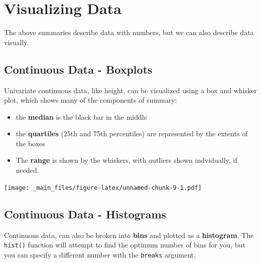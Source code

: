 \documentclass[
]{book}
\newenvironment{Shaded}{\begin{snugshade}}{\end{snugshade}}
\newcommand{\AttributeTok}[1]{\textcolor[rgb]{0.77,0.63,0.00}{#1}}
\newcommand{\FunctionTok}[1]{\textcolor[rgb]{0.00,0.00,0.00}{#1}}
\newcommand{\NormalTok}[1]{#1}
\newcommand{\SpecialCharTok}[1]{\textcolor[rgb]{0.00,0.00,0.00}{#1}}
\newcommand{\StringTok}[1]{\textcolor[rgb]{0.31,0.60,0.02}{#1}}
\providecommand{\tightlist}{%
  \setlength{\itemsep}{0pt}\setlength{\parskip}{0pt}}
\begin{document}
\hypertarget{visualizing-data}{%
\section{Visualizing Data}\label{visualizing-data}}

The above summaries describe data with numbers, but we can also describe data visually.

\hypertarget{continuous-data---boxplots}{%
\subsection{Continuous Data - Boxplots}\label{continuous-data---boxplots}}

Univariate continuous data, like height, can be visualized using a box and whisker plot, which shows many of the components of summary:

\begin{itemize}
\tightlist
\item
  the \textbf{median} is the black bar in the middle
\item
  the \textbf{quartiles} (25th and 75th percentiles) are represented by the extents of the boxes
\item
  The \textbf{range} is shown by the whiskers, with outliers shown indvidually, if needed.
\end{itemize}

\begin{Shaded}
\end{Shaded}

\texttt{[image: \_main\_files/figure-latex/unnamed-chunk-9-1.pdf]}

\hypertarget{continuous-data---histograms}{%
\subsection{Continuous Data - Histograms}\label{continuous-data---histograms}}

Continuous data, can also be broken into \textbf{bins} and plotted as a \textbf{histogram}. The \texttt{hist()} function will attempt to find the optimum number of bins for you, but you can specify a different number with the \texttt{breaks} argument.

\begin{Shaded}
\end{Shaded}
\end{document}

